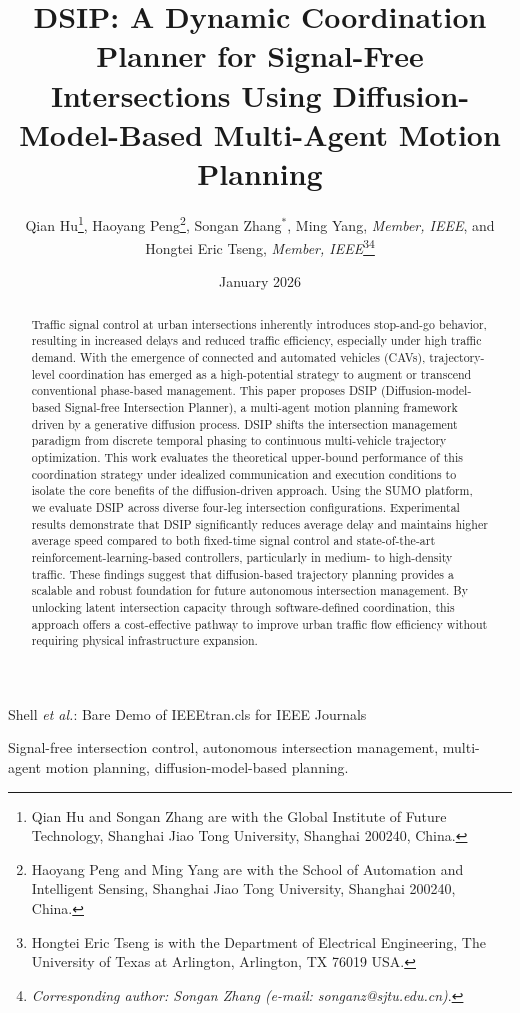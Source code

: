 \documentclass[journal]{IEEEtran}
\title{DSIP: A Dynamic Coordination Planner for Signal-Free Intersections Using Diffusion-Model-Based Multi-Agent Motion Planning}
\author{Qian Hu\thanks{Qian Hu and Songan Zhang are with the Global Institute of Future Technology, Shanghai Jiao Tong University, Shanghai 200240, China.}, Haoyang Peng\thanks{Haoyang Peng and Ming Yang are with the School of Automation and Intelligent Sensing, Shanghai Jiao Tong University, Shanghai 200240, China.}, Songan Zhang$^*$, Ming Yang, \textit{Member, IEEE}, and Hongtei Eric Tseng, \textit{Member, IEEE}\thanks{Hongtei Eric Tseng is with the Department of Electrical Engineering, The University of Texas at Arlington, Arlington, TX 76019 USA.}\thanks{\textit{Corresponding author: Songan Zhang (e-mail: songanz@sjtu.edu.cn)}.} }
\date{January 2026}
\begin{document}
%
{Shell \MakeLowercase{\textit{et al.}}: Bare Demo of IEEEtran.cls for IEEE Journals}

\maketitle

\begin{abstract}
Traffic signal control at urban intersections inherently introduces stop-and-go behavior, resulting in increased delays and reduced traffic efficiency, especially under high traffic demand. With the emergence of connected and automated vehicles (CAVs), trajectory-level coordination has emerged as a high-potential strategy to augment or transcend conventional phase-based management. This paper proposes DSIP (Diffusion-model-based Signal-free Intersection Planner), a multi-agent motion planning framework driven by a generative diffusion process. DSIP shifts the intersection management paradigm from discrete temporal phasing to continuous multi-vehicle trajectory optimization. This work evaluates the theoretical upper-bound performance of this coordination strategy under idealized communication and execution conditions to isolate the core benefits of the diffusion-driven approach. Using the SUMO platform, we evaluate DSIP across diverse four-leg intersection configurations. Experimental results demonstrate that DSIP significantly reduces average delay and maintains higher average speed compared to both fixed-time signal control and state-of-the-art reinforcement-learning-based controllers, particularly in medium- to high-density traffic. These findings suggest that diffusion-based trajectory planning provides a scalable and robust foundation for future autonomous intersection management. By unlocking latent intersection capacity through software-defined coordination, this approach offers a cost-effective pathway to improve urban traffic flow efficiency without requiring physical infrastructure expansion.
\end{abstract}
\begin{IEEEkeywords}
Signal-free intersection control, autonomous intersection management, multi-agent motion planning, diffusion-model-based planning.
\end{IEEEkeywords}
\end{document}
